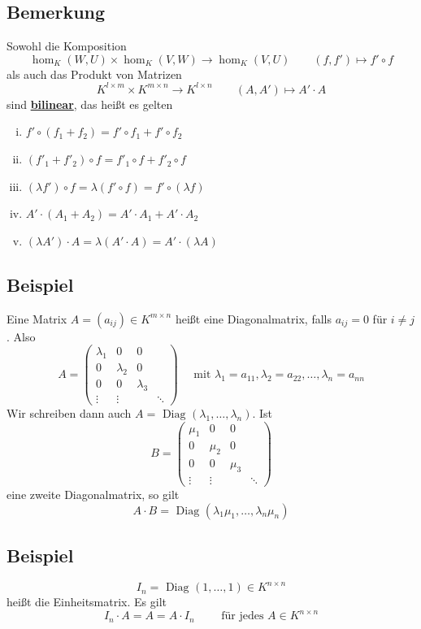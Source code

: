 \subsection{Bemerkung} %
\label{sub:bemerkung}
Sowohl die Komposition
\[
	\hom_K (W,U) \times \hom_K (V,W) \to \hom_K (V,U) \qquad (f,f') \mapsto f' \circ f
\]
als auch das Produkt von Matrizen
\[
	K^{l \times m} \times K^{m \times n} \to K^{l \times n} \qquad (A,A') \mapsto A' \cdot A
\]
sind \textbf{\underline{bilinear}}, das heißt es gelten
\begin{enumerate}[(i)]
	\item $f' \circ (f_1 + f_2) = f' \circ f_1 + f' \circ f_2$
	\item $(f'_1 + f'_2) \circ f = f'_1 \circ f + f'_2 \circ f$
	\item $(\lambda f') \circ f = \lambda (f' \circ f) = f' \circ (\lambda f)$
	\item $A' \cdot (A_1 + A_2) = A' \cdot A_1 + A' \cdot A_2$
	\item $(\lambda A') \cdot A = \lambda (A' \cdot A) = A' \cdot (\lambda A)$
\end{enumerate}

\subsection{Beispiel} %
\label{sub:beispiel}
Eine Matrix $A= (a_{ij}) \in K^{m \times n}$ heißt eine Diagonalmatrix, falls $a_{ij}=0$ für $i \not= j$. Also 
\[
	A= \begin{pmatrix}
		\lambda_1 & 0 & 0  & \\
		0 & \lambda_2 & 0 & \\
		0 & 0 & \lambda_3 & \\
		\vdots & \vdots & & \ddots
	\end{pmatrix} \quad \text{ mit } \lambda_1 = a_{11} , \lambda_2 = a_{22}, \ldots ,\lambda_n = a_{nn}
\]
Wir schreiben dann auch $A= \text{ Diag }(\lambda_1 , \ldots , \lambda_n)$. Ist
\[
	B= \begin{pmatrix}
		\mu_1 & 0 & 0  & \\
		0 & \mu_2 & 0 & \\
		0 & 0 & \mu_3 & \\
		\vdots & \vdots & & \ddots
	\end{pmatrix}
\]
eine zweite Diagonalmatrix, so gilt
\[
	A \cdot B = \text{ Diag }(\lambda_1 \mu_1 , \ldots , \lambda_n \mu_n)
\]

\subsection{Beispiel} %
\label{sub:beispiel}
\[
	I_n = \text{ Diag } (1, \ldots , 1) \in K^{n \times n}
\]
heißt die Einheitsmatrix. Es gilt
\[
	I_n \cdot A = A = A \cdot I_n \qquad \text{ für jedes } A \in K^{n \times n}
\]

